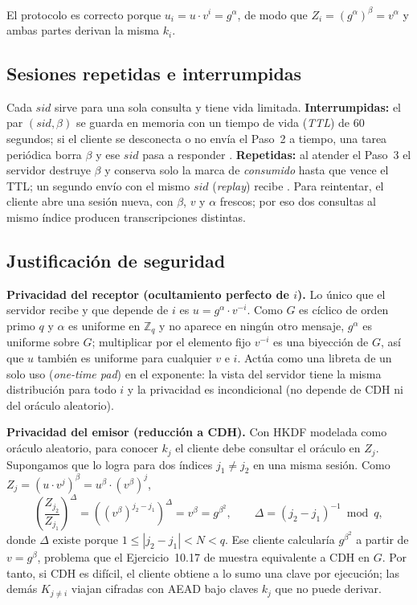 El protocolo es correcto porque $u_i = u\cdot v^i = g^\alpha$, de modo que
$Z_i = (g^\alpha)^\beta = v^\alpha$ y ambas partes derivan la misma $k_i$.

\subsection{Sesiones repetidas e interrumpidas}
Cada $sid$ sirve para una sola consulta y tiene vida limitada.
\textbf{Interrumpidas:} el par $(sid, \beta)$ se guarda en memoria con un
tiempo de vida (\emph{TTL}) de 60 segundos; si el cliente se desconecta o no
env\'ia el Paso~2 a tiempo, una tarea peri\'odica borra $\beta$ y ese $sid$
pasa a responder . \textbf{Repetidas:} al atender el
Paso~3 el servidor destruye $\beta$ y conserva solo la marca de
\emph{consumido} hasta que vence el TTL; un segundo env\'io con el mismo
$sid$ (\emph{replay}) recibe . Para reintentar, el cliente
abre una sesi\'on nueva, con $\beta$, $v$ y $\alpha$ frescos; por eso dos
consultas al mismo \'indice producen transcripciones distintas.

\subsection{Justificaci\'on de seguridad}

\textbf{Privacidad del receptor (ocultamiento perfecto de $i$).}
Lo \'unico que el servidor recibe y que depende de $i$ es
$u = g^\alpha \cdot v^{-i}$. Como $G$ es c\'iclico de orden primo $q$ y
$\alpha$ es uniforme en $\mathbb{Z}_q$ y no aparece en ning\'un otro mensaje,
$g^\alpha$ es uniforme sobre $G$; multiplicar por el elemento fijo $v^{-i}$
es una biyecci\'on de $G$, as\'i que $u$ tambi\'en es uniforme para cualquier
$v$ e $i$. Act\'ua como una libreta de un solo uso (\emph{one-time pad}) en
el exponente: la vista del servidor tiene la misma distribuci\'on para todo
$i$ y la privacidad es incondicional (no depende de CDH ni del or\'aculo
aleatorio).

\textbf{Privacidad del emisor (reducci\'on a CDH).}
Con HKDF modelada como or\'aculo aleatorio, para conocer $k_j$ el cliente
debe consultar el or\'aculo en $Z_j$. Supongamos que lo logra para dos
\'indices $j_1 \ne j_2$ en una misma sesi\'on. Como
$Z_j = (u \cdot v^j)^\beta = u^\beta \cdot (v^\beta)^j$,
\begin{equation}
\left( \frac{Z_{j_2}}{Z_{j_1}} \right)^{\Delta}
= \left( (v^\beta)^{j_2 - j_1} \right)^{\Delta} = v^\beta = g^{\beta^2},
\qquad \Delta = (j_2 - j_1)^{-1} \bmod q,
\end{equation}
donde $\Delta$ existe porque $1 \le |j_2 - j_1| < N < q$. Ese cliente
calcular\'ia $g^{\beta^2}$ a partir de $v = g^\beta$, problema que el
Ejercicio~10.17 de \cite{boneh-shoup-v06} muestra equivalente a CDH en $G$.
Por tanto, si CDH es dif\'icil, el cliente obtiene a lo sumo una clave por
ejecuci\'on; las dem\'as $K_{j\ne i}$ viajan cifradas con AEAD bajo claves
$k_j$ que no puede derivar.

